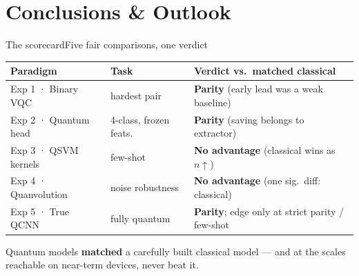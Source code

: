 \section{Conclusions \& Outlook}

\begin{frame}{The scorecard}{Five fair comparisons, one verdict}
    \centering\small
    \setlength{\tabcolsep}{6pt}
    \renewcommand{\arraystretch}{1.25}
    \begin{tabular}{lll}
        \toprule
        \textbf{Paradigm}    & \textbf{Task}          & \textbf{Verdict vs.\ matched classical}                \\
        \midrule
        Exp 1 · Binary VQC   & hardest pair           & \textbf{Parity} (early lead was a weak baseline)       \\
        Exp 2 · Quantum head & 4-class, frozen feats. & \textbf{Parity} (saving belongs to extractor)          \\
        Exp 3 · QSVM kernels & few-shot               & \textbf{No advantage} (classical wins as $n\uparrow$)  \\
        Exp 4 · Quanvolution & noise robustness       & \textbf{No advantage} (one sig.\ diff: classical)      \\
        Exp 5 · True QCNN    & fully quantum          & \textbf{Parity}; edge only at strict parity / few-shot \\
        \bottomrule
    \end{tabular}
    \vspace{6pt}
    \begin{callout}
        Quantum models \textbf{matched} a carefully built classical model --- and at
        the scales reachable on near-term devices, never beat it.
    \end{callout}
\end{frame}


